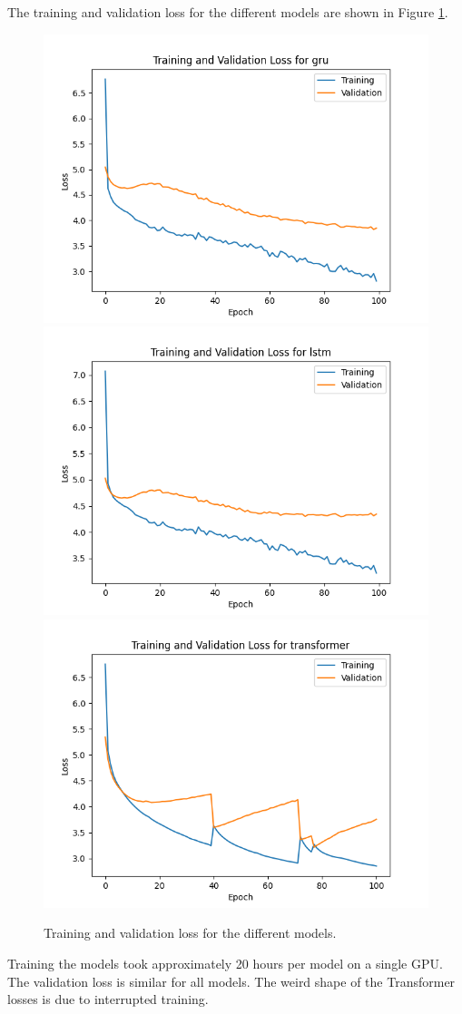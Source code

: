 \documentclass[12pt]{article}
\theoremstyle{plain}
\theoremstyle{definition}
\theoremstyle{remark}
\begin{document}
The training and validation loss for the different models are shown in Figure \ref{fig:loss}.
\begin{figure}[H]
    \centering
    \includegraphics[width=.3\textwidth]{res/training-gru.png}
    \includegraphics[width=.3\textwidth]{res/training-lstm.png}
    \includegraphics[width=.3\textwidth]{res/training-transformer.png}
    \caption{Training and validation loss for the different models.}\label{fig:loss}
\end{figure}
Training the models took approximately 20 hours per model on a single GPU. The validation loss is similar for all models. The weird shape of the Transformer losses is due to interrupted training.
\end{document}
